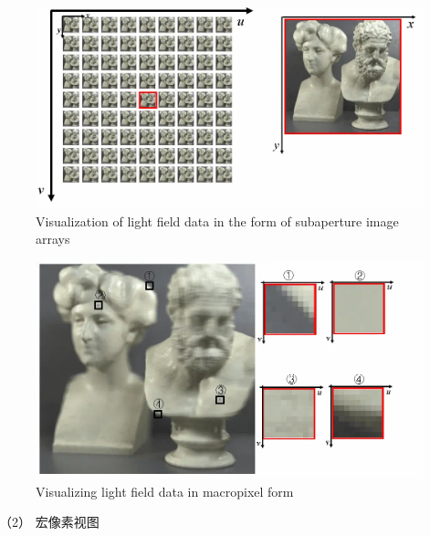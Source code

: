 





\begin{figure}[!ht]
	\centering
	\includegraphics[width=0.75\linewidth]{figures/chapter2/multi_photo}
	{Visualization of light field data in the form of subaperture image arrays}  
	\label{chapter2_fig5:multi_photo}
\end{figure}
%
%
%
%
\begin{figure}[!ht]
	\centering
	\includegraphics[width=0.80\linewidth]{figures/chapter2/macro_photo}
	{Visualizing light field data in macropixel form}  
	\label{cpt2_fig5:macro_photo}
\end{figure}
%
%
%
%



（2）
宏像素视图





